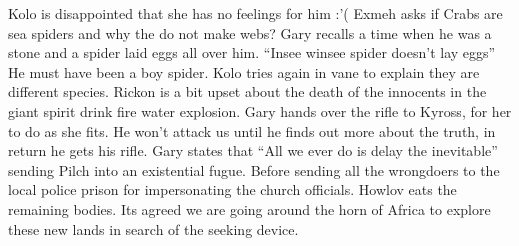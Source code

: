 Kolo is disappointed that she has no feelings for him :’(\medskip
Exmeh asks if Crabs are sea spiders and why the do not make webs?\medskip
Gary recalls a time when he was a stone and a spider laid eggs all over him.\medskip
“Insee winsee spider doesn’t lay eggs” He must have been a boy spider.\medskip
Kolo tries again in vane to explain they are different species.\medskip
Rickon is a bit upset about the death of the innocents in the giant spirit drink fire water explosion.\medskip
Gary hands over the rifle to Kyross, for her to do as she fits. He won’t attack us until he finds out more about the truth, in return he gets his rifle.\medskip
Gary states that “All we ever do is delay the inevitable” sending Pilch into an existential fugue.\medskip
Before sending all the wrongdoers to the local police prison for impersonating the church officials.\medskip
Howlov eats the remaining bodies.\medskip
Its agreed we are going around the horn of Africa to explore these new lands in search of the seeking device.